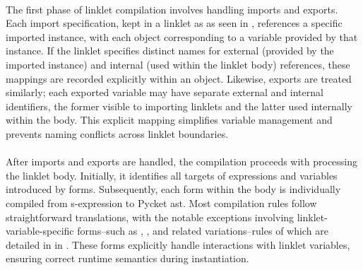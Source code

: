 		\paragraph{}%
			The first phase of linklet compilation involves handling imports and exports. Each import specification, kept in a linklet as \pycketcode{[Import ...]} as seen in , references a specific imported instance, with each  object corresponding to a variable provided by that instance. If the linklet specifies distinct names for external (provided by the imported instance) and internal (used within the linklet body) references, these mappings are recorded explicitly within an  object. Likewise, exports are treated similarly; each exported variable may have separate external and internal identifiers, the former visible to importing linklets and the latter used internally within the body. This explicit mapping simplifies variable management and prevents naming conflicts across linklet boundaries.

		\paragraph{}%
			After imports and exports are handled, the compilation proceeds with processing the linklet body. Initially, it identifies all targets of  expressions and variables introduced by  forms. Subsequently, each form within the body is individually compiled from s-expression to Pycket \gls{ast}. Most compilation rules follow straightforward translations, with the notable exceptions involving linklet-variable-specific forms--such as , , and related variations--rules of which are detailed in  in . These forms explicitly handle interactions with linklet variables, ensuring correct runtime semantics during instantiation.

